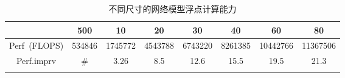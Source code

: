 \begin{center}
\begin{table}
	\caption{不同尺寸的网络模型浮点计算能力}
	\renewcommand\arraystretch{1.2}
	\begin{tabular}{cccccccc}
	\toprule
		 				&		500		&	10		&	20		&	30		&	40		&	60		&	80		\\	\midrule
		Perf~(FLOPS)	&		534846	&	1745772	&	4543788	&	6743220	&	8261385	&	10442766&	11367506	\\	\hline
		Perf.imprv		&		\#		&	3.26	&	8.5		&	12.6	&	15.5	&	19.5	&	21.3	\\
	\bottomrule
	\label{tab:flops}
	\end{tabular}
\end{table}
\vspace{-3em}
\end{center}


